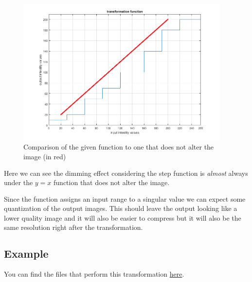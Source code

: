 \documentclass[12pt, a4paper]{article}
\begin{document}
\begin{figure}[H]
    \begin{center}
        \includegraphics[width=0.95\textwidth]{figures/step_fun_vs_y_eq_x.png}
    \end{center}
    \caption{Comparison of the given function to one that does not alter the image (in red)}\label{fig:funcCompare}
\end{figure}

\begin{multicols}{2}

    Here we can see the dimming effect considering the step function is \textit{almost} always under the $y = x$ function that does not alter the image.
    \newline

    Since the function assigns an input range to a singular value we can expect some quantization of the output images. This should leave the output looking like a lower quality image and it will also be easier to compress but it will also be the same resolution right after the transformation.
    \newline

    \subsection{Example} \label{subsec:example}

    You can find the files that perform this transformation \href{https://github.com/ArisPodotas/Image-Processing-EX1/blob/master/src/req1.py}{here}.
    \newline

\end{multicols}
\end{document}
